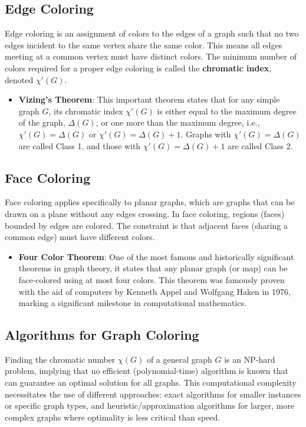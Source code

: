 \documentclass[11pt, a4paper]{article}
\begin{document}
\subsection{Edge Coloring}
Edge coloring is an assignment of colors to the edges of a graph such that no two edges incident to the same vertex share the same color. This means all edges meeting at a common vertex must have distinct colors. The minimum number of colors required for a proper edge coloring is called the \textbf{chromatic index}, denoted $\chi'(G)$.
\begin{itemize}[noitemsep,topsep=3pt,parsep=3pt,partopsep=0pt]
    \item \textbf{Vizing's Theorem}: This important theorem states that for any simple graph $G$, its chromatic index $\chi'(G)$ is either equal to the maximum degree of the graph, $\Delta(G)$, or one more than the maximum degree, i.e., $\chi'(G) = \Delta(G)$ or $\chi'(G) = \Delta(G)+1$. Graphs with $\chi'(G) = \Delta(G)$ are called Class 1, and those with $\chi'(G) = \Delta(G)+1$ are called Class 2.
\end{itemize}

\subsection{Face Coloring}
Face coloring applies specifically to planar graphs, which are graphs that can be drawn on a plane without any edges crossing. In face coloring, regions (faces) bounded by edges are colored. The constraint is that adjacent faces (sharing a common edge) must have different colors.
\begin{itemize}[noitemsep,topsep=3pt,parsep=3pt,partopsep=0pt]
    \item \textbf{Four Color Theorem}: One of the most famous and historically significant theorems in graph theory, it states that any planar graph (or map) can be face-colored using at most four colors. This theorem was famously proven with the aid of computers by Kenneth Appel and Wolfgang Haken in 1976, marking a significant milestone in computational mathematics.
\end{itemize}

\subsection{Algorithms for Graph Coloring}
Finding the chromatic number $\chi(G)$ of a general graph $G$ is an NP-hard problem, implying that no efficient (polynomial-time) algorithm is known that can guarantee an optimal solution for all graphs. This computational complexity necessitates the use of different approaches: exact algorithms for smaller instances or specific graph types, and heuristic/approximation algorithms for larger, more complex graphs where optimality is less critical than speed.
\end{document}
